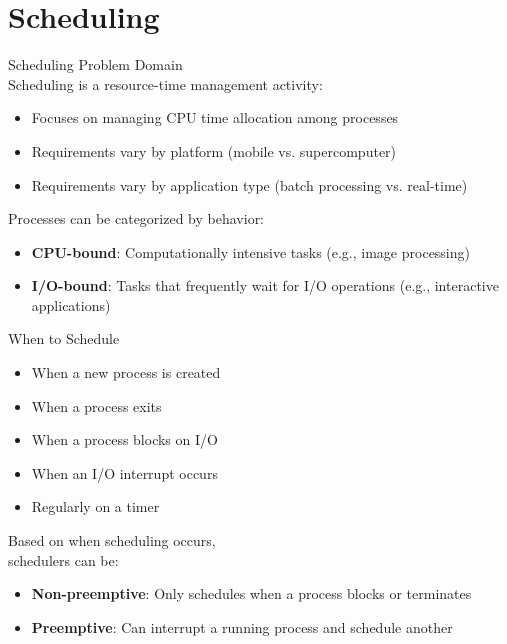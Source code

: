 \section{Scheduling}


\begin{definition}{Scheduling Problem Domain}\\
    Scheduling is a resource-time management activity:
    \begin{itemize}
        \item Focuses on managing CPU time allocation among processes
        \item Requirements vary by platform (mobile vs. supercomputer)
        \item Requirements vary by application type (batch processing vs. real-time)
    \end{itemize}
    
    Processes can be categorized by behavior:
    \begin{itemize}
        \item \textbf{CPU-bound}: Computationally intensive tasks (e.g., image processing)
        \item \textbf{I/O-bound}: Tasks that frequently wait for I/O operations (e.g., interactive applications)
    \end{itemize}
\end{definition}

\begin{concept}{When to Schedule}
    \begin{itemize}
        \item When a new process is created
        \item When a process exits
        \item When a process blocks on I/O
        \item When an I/O interrupt occurs
        \item Regularly on a timer
    \end{itemize}
    
    Based on when scheduling occurs,\\ schedulers can be:
    \begin{itemize}
        \item \textbf{Non-preemptive}: Only schedules when a process blocks or terminates
        \item \textbf{Preemptive}: Can interrupt a running process and schedule another
    \end{itemize}
\end{concept}

